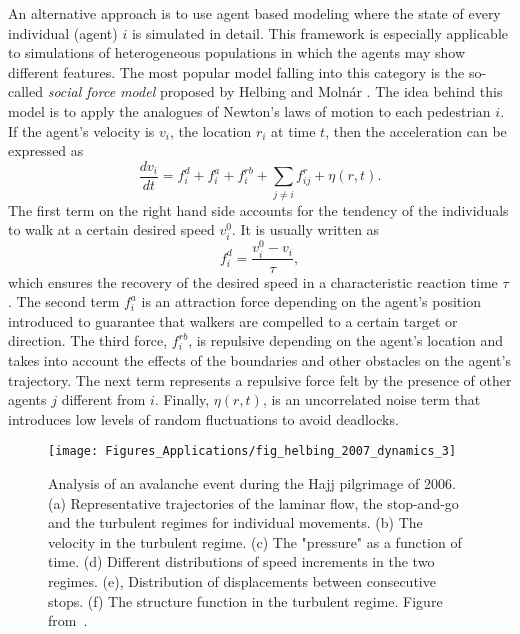 An alternative approach is to use agent based modeling where the state of every individual (agent) $i$ is simulated in detail. This framework is especially applicable to simulations of heterogeneous populations in which the agents may show different features. The most popular model falling into this category is the so-called \emph{social force model} proposed by Helbing and Moln\'ar \cite{helbing_1995_social, helbing_2001_self}. The idea behind this model is to apply the analogues of Newton's laws of motion to each pedestrian $i$. If the agent's velocity is $v_i$, the location $r_i$ at time $t$, then the acceleration can be expressed as
\begin{equation}   
\label{eq:ped:sfm}  
\frac{d v_i}{dt} = f_i^d + f_i^a + f_i^{rb} + \sum_{j \ne i} f_{ij}^r + \eta(r,t) .
\end{equation}
The first term on the right hand side accounts for the tendency of the individuals to walk at a certain desired speed $v_i^0$. It is usually written as 
\begin{equation}   
\label{eq:ped:des}  
f_i^d = \frac{v_i^0-v_i}{\tau} ,
\end{equation}     
which ensures the recovery of the desired speed in a characteristic reaction time $\tau$. The second term $f_i^a$ is an attraction force depending on the agent's position introduced to guarantee that walkers are compelled to a certain target or direction. The third force, $f_i^{rb}$, is repulsive depending on the agent's location and takes into account the effects of the boundaries and other obstacles on the agent's trajectory. The next term represents a repulsive force felt by the presence of other agents $j$ different from $i$. Finally, $\eta(r,t)$, is an uncorrelated noise term that introduces low levels of random fluctuations to avoid deadlocks.

\begin{figure}[t!]
\centering
\texttt{[image: Figures\_Applications/fig\_helbing\_2007\_dynamics\_3]}
\caption{Analysis of an avalanche event during the Hajj pilgrimage of 2006. (a) Representative trajectories of the laminar flow, the stop-and-go and the turbulent regimes for individual movements. (b) The velocity in the turbulent regime. (c) The "pressure" as a function of time. (d) Different distributions of speed increments in the two regimes. (e), Distribution of displacements between consecutive stops. (f) The structure function in the turbulent regime. Figure from~\cite{helbing_2007_dynamics}. \label{fig:helbing_2007_dynamics_3}}
\end{figure}


